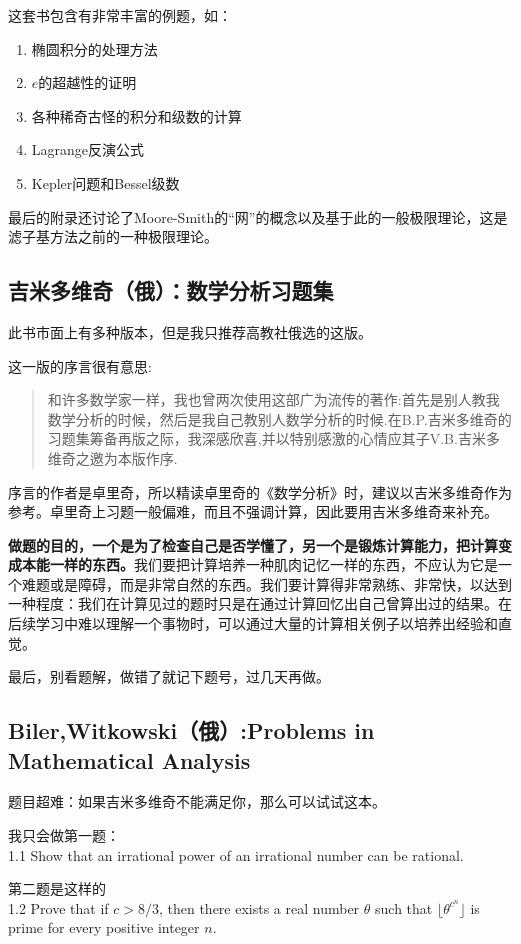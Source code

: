 \documentclass[UTF8]{article}
\begin{document}
    这套书包含有非常丰富的例题，如：\begin{enumerate}
        \item 椭圆积分的处理方法
        \item $e$的超越性的证明
        \item 各种稀奇古怪的积分和级数的计算
        \item Lagrange反演公式
        \item Kepler问题和Bessel级数
    \end{enumerate}
    最后的附录还讨论了Moore-Smith的``网''的概念以及基于此的一般极限理论，这是滤子基方法之前的一种极限理论。
    \subsection{吉米多维奇（俄）：数学分析习题集}
    此书市面上有多种版本，但是我只推荐高教社俄选的这版。

    这一版的序言很有意思:\begin{quotation}
        和许多数学家一样，我也曾两次使用这部广为流传的著作:首先是别人教我数学分析的时候，然后是我自己教别人数学分析的时候.在B.P.吉米多维奇的习题集筹备再版之际，我深感欣喜,并以特别感激的心情应其子V.B.吉米多维奇之邀为本版作序.
    \end{quotation}

    序言的作者是卓里奇，所以精读卓里奇的《数学分析》时，建议以吉米多维奇作为参考。卓里奇上习题一般偏难，而且不强调计算，因此要用吉米多维奇来补充。
    
    \textbf{做题的目的，一个是为了检查自己是否学懂了，另一个是锻炼计算能力，把计算变成本能一样的东西。}我们要把计算培养一种肌肉记忆一样的东西，不应认为它是一个难题或是障碍，而是非常自然的东西。我们要计算得非常熟练、非常快，以达到一种程度：我们在计算见过的题时只是在通过计算回忆出自己曾算出过的结果。在后续学习中难以理解一个事物时，可以通过大量的计算相关例子以培养出经验和直觉。

    最后，别看题解，做错了就记下题号，过几天再做。
    \subsection{Biler,Witkowski（俄）:Problems in Mathematical Analysis}
    题目超难：如果吉米多维奇不能满足你，那么可以试试这本。

    我只会做第一题：\\ 
    1.1 Show that an irrational power of an irrational number can be rational.

    第二题是这样的\\ 
    1.2 Prove that if $c > 8/3$, then there exists a real number $\theta$ such that $\lfloor \theta^{c^n}\rfloor $ is prime for every positive integer $n$.
\end{document}
